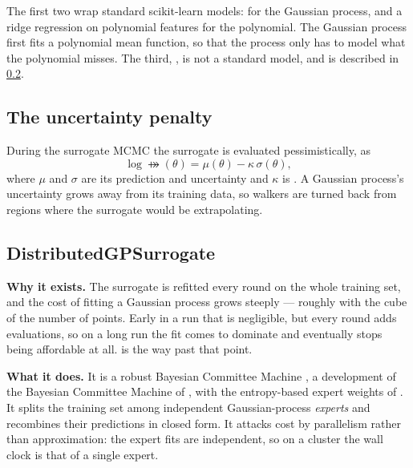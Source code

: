 The first two wrap standard scikit-learn models:
 for the Gaussian process, and a ridge regression on polynomial
features for the polynomial. The Gaussian process first fits a polynomial mean function, so that the
process only has to model what the polynomial misses. The third,
, is not a standard model, and is described in \cref{sec:rbcm}.

\subsection{The uncertainty penalty}

During the surrogate MCMC the surrogate is evaluated pessimistically, as
\begin{equation}
  \log\psur(\theta) = \mu(\theta) - \kappa\, \sigma(\theta),
\end{equation}
where $\mu$ and $\sigma$ are its prediction and uncertainty and $\kappa$ is
. A Gaussian process's uncertainty grows away from its training
data, so walkers are turned back from regions where the surrogate would be extrapolating.

\subsection{DistributedGPSurrogate}
\label{sec:rbcm}

\textbf{Why it exists.} The surrogate is refitted every round on the whole training set, and the
cost of fitting a Gaussian process grows steeply --- roughly with the cube of the number of points.
Early in a run that is negligible, but every round adds evaluations, so on a long run the fit comes
to dominate and eventually stops being affordable at all.  is the way
past that point.

\textbf{What it does.} It is a robust Bayesian Committee Machine \citep{deisenroth2015}, a
development of the Bayesian Committee Machine of \citet{tresp2000}, with the entropy-based expert
weights of \citet{cao2014}. It splits the training set among independent Gaussian-process
\emph{experts} and recombines their predictions in closed form. It attacks cost by parallelism
rather than approximation: the expert fits are independent, so on a cluster the wall clock is that of
a single expert.

